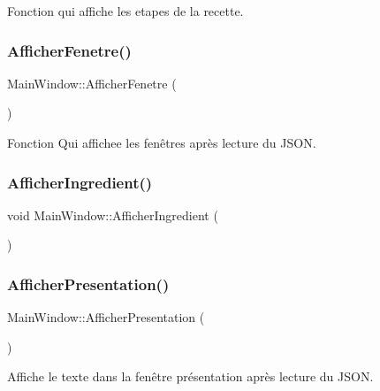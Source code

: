 Fonction qui affiche les etapes de la recette. 

\mbox{\label{class_main_window_a7f4b9726171670ec8d85bb6b09e0665d}} 
\subsubsection{\texorpdfstring{Afficher\+Fenetre()}{AfficherFenetre()}}
{\footnotesize\ttfamily Main\+Window\+::\+Afficher\+Fenetre (\begin{DoxyParamCaption}{ }\end{DoxyParamCaption})}



Fonction Qui affichee les fenêtres après lecture du J\+S\+ON. 

\mbox{\label{class_main_window_ad4059abf16eb904f988371b3791002bf}} 
\subsubsection{\texorpdfstring{Afficher\+Ingredient()}{AfficherIngredient()}}
{\footnotesize\ttfamily void Main\+Window\+::\+Afficher\+Ingredient (\begin{DoxyParamCaption}{ }\end{DoxyParamCaption})}

\mbox{\label{class_main_window_a9bf06dfcc398454facb39e71ebf32550}} 
\subsubsection{\texorpdfstring{Afficher\+Presentation()}{AfficherPresentation()}}
{\footnotesize\ttfamily Main\+Window\+::\+Afficher\+Presentation (\begin{DoxyParamCaption}{ }\end{DoxyParamCaption})}



Affiche le texte dans la fenêtre présentation après lecture du J\+S\+ON. 

